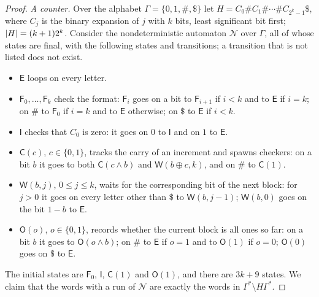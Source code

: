 \begin{proof}
\emph{A counter.} Over the alphabet $\Gamma=\{0,1,\#,\$\}$ let
$H=C_0\#C_1\#\cdots\#C_{2^k-1}\$$, where $C_j$ is the binary expansion of $j$
with $k$ bits, least significant bit first; $\lvert H\rvert=(k+1)2^k$. Consider the
nondeterministic automaton $\mathcal N$ over $\Gamma$, all of whose states are
final, with the following states and transitions; a transition that is not
listed does not exist.
\begin{itemize}[leftmargin=*]
\item $\mathsf E$ loops on every letter.
\item $\mathsf F_0,\ldots,\mathsf F_k$ check the format: $\mathsf F_i$ goes on a
  bit to $\mathsf F_{i+1}$ if $i<k$ and to $\mathsf E$ if $i=k$; on $\#$ to
  $\mathsf F_0$ if $i=k$ and to $\mathsf E$ otherwise; on $\$$ to $\mathsf E$ if
  $i<k$.
\item $\mathsf I$ checks that $C_0$ is zero: it goes on $0$ to $\mathsf I$ and
  on $1$ to $\mathsf E$.
\item $\mathsf C(c)$, $c\in\{0,1\}$, tracks the carry of an increment and
  spawns checkers: on a bit $b$ it goes to both $\mathsf C(c\land b)$ and
  $\mathsf W(b\oplus c,k)$, and on $\#$ to $\mathsf C(1)$.
\item $\mathsf W(b,j)$, $0\le j\le k$, waits for the corresponding bit of the
  next block: for $j>0$ it goes on every letter other than $\$$ to
  $\mathsf W(b,j-1)$; $\mathsf W(b,0)$ goes on the bit $1-b$ to $\mathsf E$.
\item $\mathsf O(o)$, $o\in\{0,1\}$, records whether the current block is all
  ones so far: on a bit $b$ it goes to $\mathsf O(o\land b)$; on $\#$ to
  $\mathsf E$ if $o=1$ and to $\mathsf O(1)$ if $o=0$; $\mathsf O(0)$ goes on
  $\$$ to $\mathsf E$.
\end{itemize}
The initial states are $\mathsf F_0$, $\mathsf I$, $\mathsf C(1)$ and
$\mathsf O(1)$, and there are $3k+9$ states. We claim that the words with a run
of $\mathcal N$ are exactly the words in $\Gamma^*\setminus H\Gamma^*$.


\end{proof}
